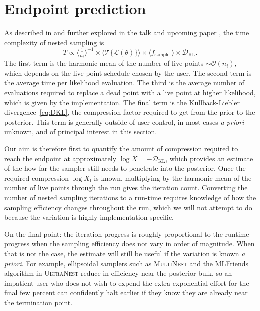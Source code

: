\documentclass[usenatbib]{mnras}
\newcommand{\nlive}{n_i}
\newcommand{\Like}{\mathcal{L}}
\newcommand{\DKL}{\mathcal{D}_\mathrm{KL}}
\begin{document}
\section{Endpoint prediction}\label{sec:endpoint}
As described in \citet{supernest} and further explored in the talk and upcoming paper \citet{kcl_talk, scaling_frontier}, the time complexity of nested sampling is
\begin{equation}
    T \propto \langle \tfrac{1}{\nlive} \rangle^{-1} \times \langle \mathcal{T}\{ \Like(\theta) \} \rangle \times \langle f_\mathrm{sampler} \rangle \times \DKL.
\end{equation}
The first term is the harmonic mean of the number of live points $\sim\mathcal{O}(n_i)$, which depends on the live point schedule chosen by the user. The second term is the average time per likelihood evaluation. The third is the average number of evaluations required to replace a dead point with a live point at higher likelihood, which is given by the implementation. The final term is the Kullback-Liebler divergence~\cref{eq:DKL}, the compression factor required to get from the prior to the posterior. This term is generally outside of user control, in most cases \textit{a priori} unknown, and of principal interest in this section.
\par
Our aim is therefore first to quantify the amount of compression required to reach the endpoint at approximately $\log X = -\DKL$, which provides an estimate of the how far the sampler still needs to penetrate into the posterior. Once the required compression $\log X_\mathrm{f}$ is known, multiplying by the harmonic mean of the number of live points through the run gives the iteration count. Converting the number of nested sampling iterations to a run-time requires knowledge of how the sampling efficiency changes throughout the run, which we will not attempt to do because the variation is highly implementation-specific. 
\par
On the final point: the iteration progress is roughly proportional to the runtime progress when the sampling efficiency does not vary in order of magnitude. When that is not the case, the estimate will still be useful if the variation is known \textit{a priori}. For example, ellipsoidal samplers such as \textsc{MultiNest} and the MLFriends algorithm in \textsc{UltraNest} reduce in efficiency near the posterior bulk, so an impatient user who does not wish to expend the extra exponential effort for the final few percent can confidently halt earlier if they know they are already near the termination point.
\end{document}
